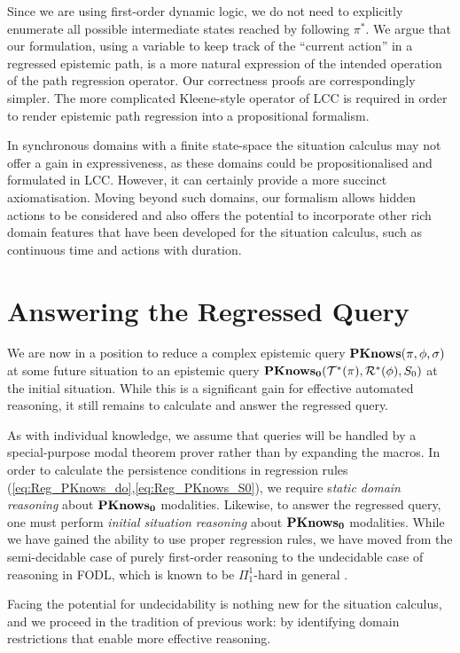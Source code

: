 Since we are using first-order dynamic logic, we do not need to explicitly
enumerate all possible intermediate states reached by following $\pi^{*}$.
We argue that our formulation, using a variable to keep track of the
{}``current action'' in a regressed epistemic path, is a more natural
expression of the intended operation of the path regression operator.
Our correctness proofs are correspondingly simpler. The more complicated
Kleene-style operator of LCC is required in order to render epistemic
path regression into a propositional formalism.

In synchronous domains with a finite state-space the situation calculus
may not offer a gain in expressiveness, as these domains could be
propositionalised and formulated in LCC. However, it can certainly
provide a more succinct axiomatisation. Moving beyond such domains,
our formalism allows hidden actions to be considered and also offers
the potential to incorporate other rich domain features that have
been developed for the situation calculus, such as continuous time
and actions with duration.


\section{Answering the Regressed Query\label{sec:CKnowledge:Reasoning}}

We are now in a position to reduce a complex epistemic query $\mathbf{PKnows}(\pi,\phi,\sigma)$
at some future situation to an epistemic query $\mathbf{PKnows_{0}}(\mathcal{T}^{*}(\pi),\mathcal{R}^{*}(\phi),S_{0})$
at the initial situation. While this is a significant gain for effective
automated reasoning, it still remains to calculate and answer the
regressed query.

As with individual knowledge, we assume that queries will be handled
by a special-purpose modal theorem prover rather than by expanding
the macros. In order to calculate the persistence conditions in regression
rules (\ref{eq:Reg_PKnows_do},\ref{eq:Reg_PKnows_S0}), we require
s\emph{tatic domain reasoning} about $\mathbf{PKnows_{0}}$ modalities. Likewise,
to answer the regressed query, one must perform \emph{initial situation
reasoning} about $\mathbf{PKnows_{0}}$ modalities. While we have gained the
ability to use proper regression rules, we have moved from the semi-decidable
case of purely first-order reasoning to the undecidable case of reasoning
in FODL, which is known to be $\Pi_{1}^{1}$-hard in general \citep{kooi07dyn_termmodal_logic}.

Facing the potential for undecidability is nothing new for the situation
calculus, and we proceed in the tradition of previous work: by identifying
domain restrictions that enable more effective reasoning.\\


